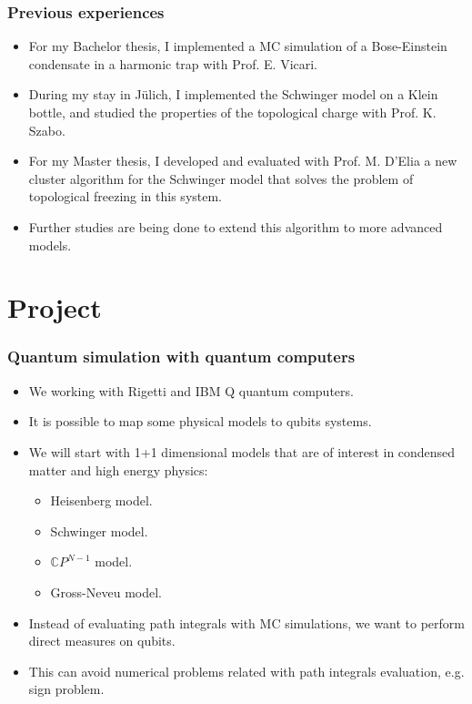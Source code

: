 \documentclass[11pt,t,xcolor=dvipsnames,aspectratio=169]{beamer}
\begin{document}
\begin{frame}
    \frametitle{Previous experiences}
    \begin{itemize}
        \item
            For my Bachelor thesis, I implemented a MC simulation of a Bose-Einstein condensate in a harmonic trap with Prof. E. Vicari.
        \item
            During my stay in J\"ulich, I implemented the Schwinger model on a Klein bottle, and studied the properties of the topological charge with Prof. K. Szabo.
        \item
            For my Master thesis, 
            I developed and evaluated with Prof. M. D'Elia
            a new cluster algorithm for the Schwinger model that solves the problem of topological freezing in this system.
        \item
            Further studies are being done to extend this algorithm to more advanced models.
    \end{itemize}
\end{frame}

\section{Project}

\begin{frame}
    \frametitle{Quantum simulation with quantum computers}
    \begin{itemize}
        \item
            We working with Rigetti and IBM Q quantum computers.
        \item
            It is possible to map some physical models to qubits systems.
        \item
            We will start with 1+1 dimensional models that are of interest in condensed matter and high energy physics:
            \begin{itemize}
                \item Heisenberg model.
                \item Schwinger model.
                \item $\mathbb CP^{N-1}$ model.
                \item Gross-Neveu model.
            \end{itemize}
        \item
            Instead of evaluating path integrals with MC simulations,
            we want to perform direct measures on qubits.
        \item
            This can avoid numerical problems related with path integrals evaluation, e.g. sign problem.
    \end{itemize}
\end{frame}
\end{document}
